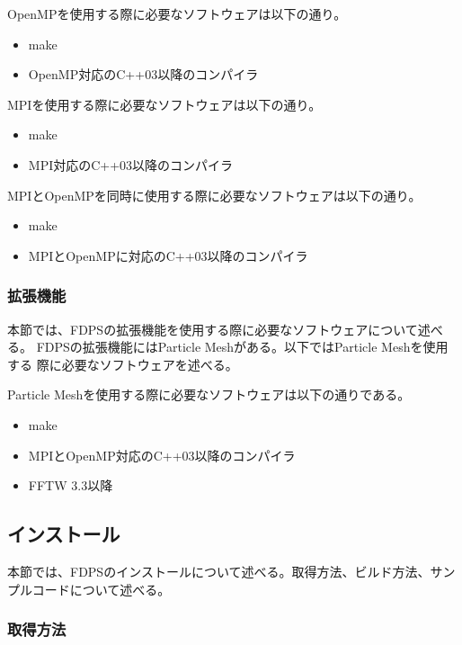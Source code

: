 OpenMPを使用する際に必要なソフトウェアは以下の通り。
\begin{itemize}
\item make
\item OpenMP対応のC++03以降のコンパイラ
\end{itemize}


MPIを使用する際に必要なソフトウェアは以下の通り。
\begin{itemize}
\item make
\item MPI対応のC++03以降のコンパイラ
\end{itemize}


MPIとOpenMPを同時に使用する際に必要なソフトウェアは以下の通り。
\begin{itemize}
\item make
\item MPIとOpenMPに対応のC++03以降のコンパイラ
\end{itemize}

\subsubsection{拡張機能}

本節では、FDPSの拡張機能を使用する際に必要なソフトウェアについて述べる。
FDPSの拡張機能にはParticle Meshがある。以下ではParticle Meshを使用する
際に必要なソフトウェアを述べる。


Particle Meshを使用する際に必要なソフトウェアは以下の通りである。
\begin{itemize}
\item make
\item MPIとOpenMP対応のC++03以降のコンパイラ
\item FFTW 3.3以降
\end{itemize}

\subsection{インストール}

本節では、FDPSのインストールについて述べる。取得方法、ビルド方法、サン
プルコードについて述べる。

\subsubsection{取得方法}

